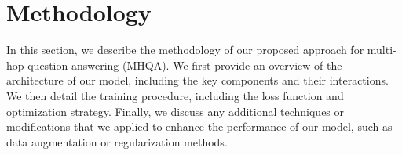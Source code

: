 \section{Methodology}
\label{methodology}
In this section, we describe the methodology of our proposed approach for multi-hop question answering (MHQA). We first provide an overview of the architecture of our model, including the key components and their interactions. We then detail the training procedure, including the loss function and optimization strategy. Finally, we discuss any additional techniques or modifications that we applied to enhance the performance of our model, such as data augmentation or regularization methods.